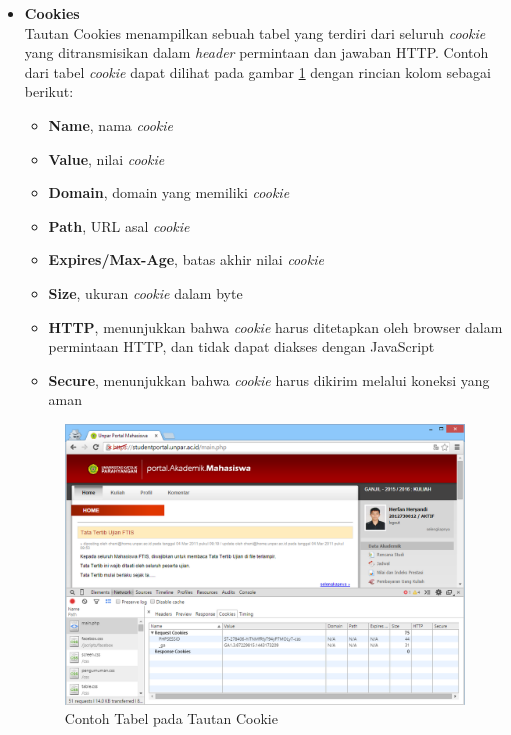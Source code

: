 \begin{itemize}
	\item \textbf{Cookies}\\
	Tautan Cookies menampilkan sebuah tabel yang terdiri dari seluruh \textit{cookie} yang ditransmisikan dalam \textit{header} permintaan dan jawaban HTTP. Contoh dari tabel \textit{cookie} dapat dilihat pada gambar \ref{fig:2_network_cookies} dengan rincian kolom sebagai berikut:
	\begin{itemize}
		\item \textbf{Name}, nama \textit{cookie}
		\item \textbf{Value}, nilai \textit{cookie}
		\item \textbf{Domain}, domain yang memiliki \textit{cookie}
		\item \textbf{Path}, URL asal \textit{cookie}
		\item \textbf{Expires/Max-Age}, batas akhir nilai \textit{cookie}
		\item \textbf{Size}, ukuran \textit{cookie} dalam byte
		\item \textbf{HTTP}, menunjukkan bahwa \textit{cookie} harus ditetapkan oleh browser dalam permintaan HTTP, dan tidak dapat diakses dengan JavaScript
		\item \textbf{Secure}, menunjukkan bahwa \textit{cookie} harus dikirim melalui koneksi yang aman
	\end{itemize}
	
\begin{figure}[H]
	\centering
	\includegraphics[scale=0.5]{Gambar/network-cookies}
	\caption{Contoh Tabel pada Tautan Cookie} 
	\label{fig:2_network_cookies}
\end{figure}

\end{itemize}

